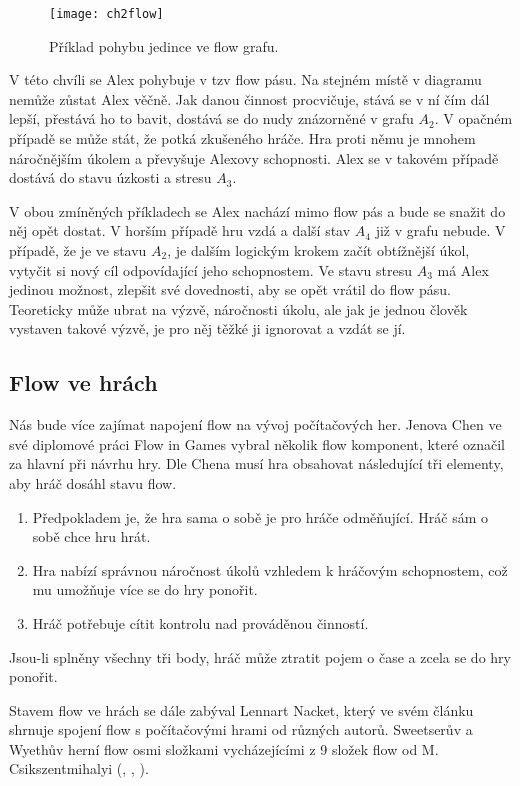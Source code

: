 \begin{figure}
  \centering
  \texttt{[image: ch2flow]}
	\caption{Příklad pohybu jedince ve flow grafu. }
	\label{fig:ch2flow}
\end{figure}

V této chvíli se Alex pohybuje v tzv flow pásu. Na stejném místě v diagramu nemůže zůstat Alex věčně. Jak danou činnost procvičuje, stává se v ní čím dál lepší, přestává ho to bavit, dostává se do nudy znázorněné v grafu $A_2$. V opačném případě se může stát, že potká zkušeného hráče. Hra proti němu je mnohem náročnějším úkolem a převyšuje Alexovy schopnosti. Alex se v takovém případě dostává do stavu úzkosti a stresu $A_3$.

V obou zmíněných příkladech se Alex nachází mimo flow pás a bude se snažit do něj opět dostat. V horším případě hru vzdá a další stav $A_4$ již v grafu nebude. V případě, že je ve stavu $A_2$, je dalším logickým krokem začít obtížnější úkol, vytyčit si nový cíl odpovídající jeho schopnostem. Ve stavu stresu $A_3$ má Alex jedinou možnost, zlepšit své dovednosti, aby se opět vrátil do flow pásu. Teoreticky může ubrat na výzvě, náročnosti úkolu, ale jak je jednou člověk vystaven takové výzvě, je pro něj těžké ji ignorovat a vzdát se jí. \cite{OptimalFun}

\subsection{Flow ve hrách}

Nás bude více zajímat napojení flow na vývoj počítačových her. Jenova Chen ve své diplomové práci Flow in Games\cite{thesisflow} vybral několik flow komponent, které označil za hlavní při návrhu hry. Dle Chena musí hra obsahovat následující tři elementy, aby hráč dosáhl stavu flow.

\begin{enumerate}
	\item Předpokladem je, že hra sama o sobě je pro hráče odměňující. Hráč sám o sobě chce hru hrát.
	\item Hra nabízí správnou náročnost úkolů vzhledem k hráčovým schopnostem, což mu umožňuje více se do hry ponořit.
	\item Hráč potřebuje cítit kontrolu nad prováděnou činností.
\end{enumerate}

Jsou-li splněny všechny tři body, hráč může ztratit pojem o čase a zcela se do hry ponořit.

Stavem flow ve hrách se dále zabýval Lennart Nacket, který ve svém článku\cite{FlowAll} shrnuje spojení flow s počítačovými hrami od různých autorů. Sweetserův a Wyethův herní flow osmi složkami vycházejícími z 9 složek flow od M. Csikszentmihalyi (\cite{OptimalFun}, \cite{FlowEng}, \cite{FlowCZ}).

